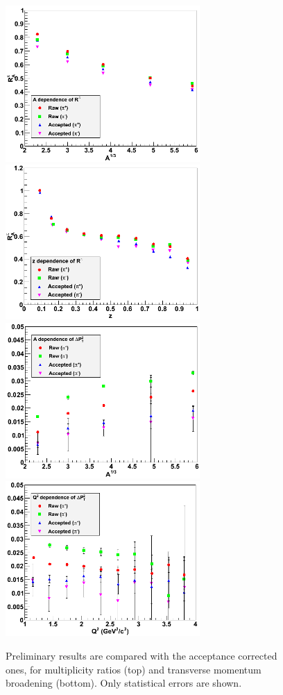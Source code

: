\begin{figure}[tbp]
\centering
\includegraphics[width=7.4cm] {chap5-fig/b_RvA.png} 
\includegraphics[width=7.4cm] {chap5-fig/b_RvZ.png} 
\includegraphics[width=7.4cm] {chap5-fig/b_PvA.png} 
\includegraphics[width=7.4cm] {chap5-fig/b_PvQ2.png} 
\caption {Preliminary results are compared with the acceptance corrected ones, 
for multiplicity ratios (top) and transverse momentum broadening 
(bottom). Only statistical errors are shown.}
\label{fig:AcceptPlots}
\end{figure}

